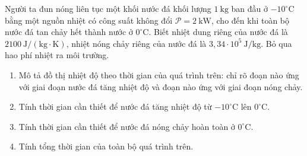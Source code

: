 \begin{bt}
	{\color{red}\footnotesize\ttfamily [L12C1B1-TL-5]}\par %
	Người ta đun nóng liên tục một khối nước đá khối lượng $1\ \mathrm{kg}$ ban đầu ở $-10^\circ\mathrm{C}$ bằng một nguồn nhiệt có công suất không đổi $\mathcal{P} = 2\ \mathrm{kW}$, cho đến khi toàn bộ nước đá tan chảy hết thành nước ở $0^\circ\mathrm{C}$. Biết nhiệt dung riêng của nước đá là $2100\ \mathrm{J/(kg\cdot K)}$, nhiệt nóng chảy riêng của nước đá là $3{,}34 \cdot 10^5\ \mathrm{J/kg}$. Bỏ qua hao phí nhiệt ra môi trường.
	\begin{enumerate}
		\item Mô tả đồ thị nhiệt độ theo thời gian của quá trình trên: chỉ rõ đoạn nào ứng với giai đoạn nước đá tăng nhiệt độ và đoạn nào ứng với giai đoạn nóng chảy.
		\item Tính thời gian cần thiết để nước đá tăng nhiệt độ từ $-10^\circ\mathrm{C}$ lên $0^\circ\mathrm{C}$.
		\item Tính thời gian cần thiết để nước đá nóng chảy hoàn toàn ở $0^\circ\mathrm{C}$.
		\item Tính tổng thời gian của toàn bộ quá trình trên.
	\end{enumerate}
\end{bt}
